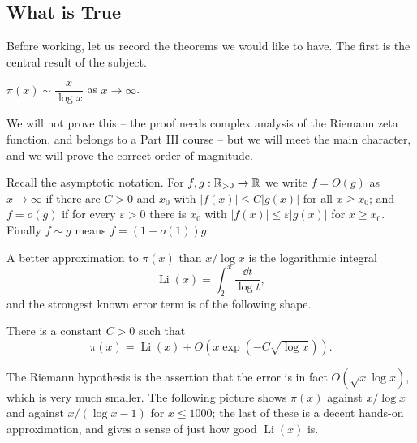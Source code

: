 \documentclass[a4paper]{scrartcl}
\DeclareMathOperator{\Li}{Li}
\begin{document}
\subsection{What is True}

Before working, let us record the theorems we would like to have. The first is the central result of the subject.

\begin{theorem}\label{thm:pnt}
	$\pi(x) \sim \dfrac{x}{\log x}$ as $x \to \infty$.
\end{theorem}

We will not prove this -- the proof needs complex analysis of the Riemann zeta function, and belongs to a Part III course -- but we will meet the main character, and we will prove the correct order of magnitude.

\begin{remark}
	Recall the asymptotic notation. For $f, g : \mathbb{R}_{>0} \to \mathbb{R}$ we write $f = O(g)$ as $x \to \infty$ if there are $C > 0$ and $x_0$ with $|f(x)| \leq C|g(x)|$ for all $x \geq x_0$; and $f = o(g)$ if for every $\varepsilon > 0$ there is $x_0$ with $|f(x)| \leq \varepsilon|g(x)|$ for $x \geq x_0$. Finally $f \sim g$ means $f = (1 + o(1))g$.
\end{remark}

A better approximation to $\pi(x)$ than $x/\log x$ is the logarithmic integral
$$
\Li(x) = \int_2^x \frac{\dd t}{\log t},
$$
and the strongest known error term is of the following shape.

\begin{theorem}
	There is a constant $C > 0$ such that
	$$
	\pi(x) = \Li(x) + O\!\left(x \exp\left(-C\sqrt{\log x}\right)\right).
	$$
\end{theorem}

The Riemann hypothesis is the assertion that the error is in fact $O(\sqrt x \log x)$, which is very much smaller. The following picture shows $\pi(x)$ against $x/\log x$ and against $x/(\log x - 1)$ for $x \leq 1000$; the last of these is a decent hands-on approximation, and gives a sense of just how good $\Li(x)$ is.
\end{document}
